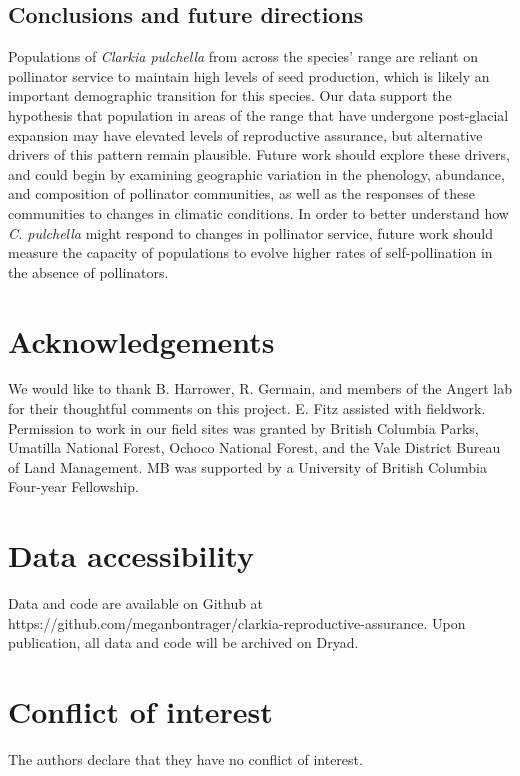 \documentclass{article}
\begin{document}
\subsection*{Conclusions and future directions}
Populations of \textit{Clarkia pulchella} from across the species' range are reliant on pollinator service to maintain high levels of seed production, which is likely an important demographic transition for this species. Our data support the hypothesis that population in areas of the range that have undergone post-glacial expansion may have elevated levels of reproductive assurance, but alternative drivers of this pattern remain plausible. Future work should explore these drivers, and could begin by examining geographic variation in the phenology, abundance, and composition of pollinator communities, as well as the responses of these communities to changes in climatic conditions. In order to better understand how \textit{C. pulchella} might respond to changes in pollinator service, future work should measure the capacity of populations to evolve higher rates of self-pollination in the absence of pollinators. 

\section*{Acknowledgements}
We would like to thank B. Harrower, R. Germain, and members of the Angert lab for their thoughtful comments on this project. E. Fitz assisted with fieldwork. Permission to work in our field sites was granted by British Columbia Parks, Umatilla National Forest, Ochoco National Forest, and the Vale District Bureau of Land Management. MB was supported by a University of British Columbia Four-year Fellowship.

\section*{Data accessibility}
Data and code are available on Github at https://github.com/meganbontrager/clarkia-reproductive-assurance. Upon publication, all data and code will be archived on Dryad.

\section*{Conflict of interest} 
The authors declare that they have no conflict of interest.




\clearpage
\end{document}
